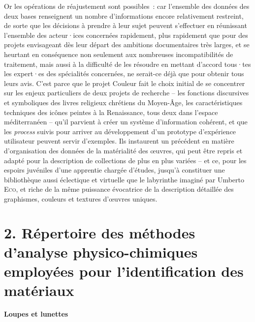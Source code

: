 \documentclass[a4paper,12pt, twoside]{book}
\begin{document}
Or les opérations de réajustement sont possibles~: car l’ensemble des données des deux bases renseignent un nombre d’informations encore relativement restreint, de sorte que les décisions à prendre à leur sujet peuvent s’effectuer en réunissant l’ensemble des acteur·ices concernées rapidement, plus rapidement que pour des projets envisageant dès leur départ des ambitions documentaires très larges, et se heurtant en conséquence non seulement aux nombreuses incompatibilités de traitement, mais aussi à la difficulté de les résoudre en mettant d’accord tous·tes les expert·es des spécialités concernées, ne serait-ce déjà que pour obtenir tous leurs avis. C’est parce que le projet Couleur fait le choix initial de se concentrer sur les enjeux particuliers de deux projets de recherche -- les fonctions discursives et symboliques des livres religieux chrétiens du Moyen-Âge, les caractéristiques techniques des icônes peintes à la Renaissance, tous deux dans l’espace méditerranéen -- qu’il parvient à créer un système d’information cohérent, et que les \textit{process} suivis pour arriver au développement d’un prototype d’expérience utilisateur peuvent servir d’exemples. Ils instaurent un précédent en matière d’organisation des données de la matérialité des œuvres, qui peut être repris et adapté pour la description de collections de plus en plus variées – et ce, pour les espoirs juvéniles d’une apprentie chargée d’études, jusqu’à constituer une bibliothèque aussi éclectique et virtuelle que le labyrinthe imaginé par Umberto \textsc{Eco}, et riche de la même puissance évocatrice de la description détaillée des graphismes, couleurs et textures d’œuvres uniques.

\appendix
\renewcommand{\appendixpagename}{Annexes}
\appendixpage
\renewcommand{\appendixtocname}{Annexes}
\addappheadtotoc

\printbibliography[title=1. Bibliographie]

\clearemptydoublepage
\chapter*{2. Répertoire des méthodes d’analyse physico-chimiques employées pour l’identification des matériaux}

\large \textbf{\textcolor{teal2}{Loupes et lunettes}}\\
\end{document}
